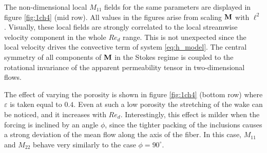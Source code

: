 The non-dimensional local $M_{11}$ fields for the same parameters are displayed in figure \ref{fig:1ch4} (mid row). All values in the figures 
arise from scaling $\bf{M}$ with $\ell^2$. Visually, these local fields are strongly correlated to the local streamwise velocity component in the whole $Re_d$ range. 
This is not unexpected since the local velocity drives the convective term of system \eqref{eq:h_model}. 
The central symmetry of all components of $\bf{M}$ in the Stokes regime is coupled to the rotational invariance of the apparent permeability tensor in two-dimensional flows.

The effect of varying the porosity is shown in figure \ref{fig:1ch4} (bottom row) where $\varepsilon$ is taken equal to $0.4$. Even at such a
low porosity the stretching of the wake can be noticed, and it increases with $Re_d$. Interestingly, this effect is milder when
the forcing is inclined by an angle $\phi$, since the tighter packing of the inclusions causes a strong deviation of the mean flow along the axis of the fiber. In this case, $M_{11}$ and $M_ {22}$ behave very similarly to the case $\phi = 90^{\circ}$.    


